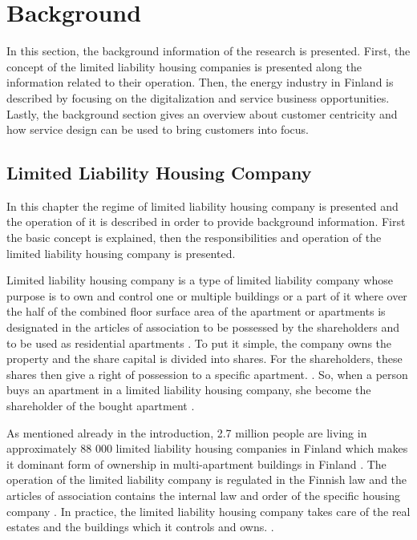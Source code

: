 \chapter{Background}
\label{chapter:background} 

In this section, the background information of the research is presented. First, the concept of the limited liability housing companies is presented along the information related to their operation. Then, the energy industry in Finland is described by focusing on the digitalization and service business opportunities. Lastly, the background section gives an overview about customer centricity and how service design can be used to bring customers into focus.

\section{Limited Liability Housing Company}

In this chapter the regime of limited liability housing company is presented and the operation of it is described in order to provide background information. First the basic concept is explained, then the responsibilities and operation of the limited liability housing company is presented.

Limited liability housing company is a type of limited liability company whose purpose is to own and control one or multiple buildings or a part of it where over the half of the combined floor surface area of the apartment or apartments is designated in the articles of association to be possessed by the shareholders and to be used as residential apartments \parencite{LLHA:2}. To put it simple, the company owns the property and the share capital is divided into shares. For the shareholders, these shares then give a right of possession to a specific apartment. \parencite{Lujanen:2017}. So, when a person buys an apartment in a limited liability housing company, she become the shareholder of the bought apartment \parencite{YIT}.

As mentioned already in the introduction, 2.7 million people are living in approximately 88 000 limited liability housing companies in Finland which makes it dominant form of ownership in multi-apartment buildings in Finland \parencite{REMF, Stats, Lujanen:2017}. The operation of the limited liability company is regulated in the Finnish law and the articles of association contains the internal law and order of the specific housing company \parencite{YIT}. In practice, the limited liability housing company takes care of the real estates and the buildings which it controls and owns. \parencite{LLHA:2}. 

